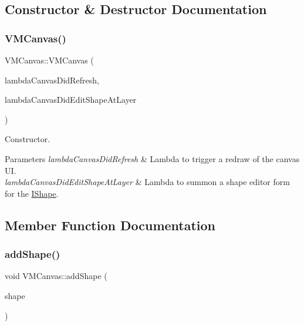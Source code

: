 \subsection{Constructor \& Destructor Documentation}
\mbox{\label{class_v_m_canvas_a82b848f9bd6e7fac849fdf1096bfb682}} 
\subsubsection{\texorpdfstring{VMCanvas()}{VMCanvas()}}
{\footnotesize\ttfamily V\+M\+Canvas\+::\+V\+M\+Canvas (\begin{DoxyParamCaption}\item[{std\+::function$<$ void(void)$>$}]{lambda\+Canvas\+Did\+Refresh,  }\item[{std\+::function$<$ void(\mbox{\hyperlink{class_i_shape}{I\+Shape}} $\ast$)$>$}]{lambda\+Canvas\+Did\+Edit\+Shape\+At\+Layer }\end{DoxyParamCaption})}



Constructor. 


\begin{DoxyParams}{Parameters}
{\em lambda\+Canvas\+Did\+Refresh} & Lambda to trigger a redraw of the canvas UI. \\
\hline
{\em lambda\+Canvas\+Did\+Edit\+Shape\+At\+Layer} & Lambda to summon a shape editor form for the \mbox{\hyperlink{class_i_shape}{I\+Shape}}. \\
\hline
\end{DoxyParams}


\subsection{Member Function Documentation}
\mbox{\label{class_v_m_canvas_a1dafa7eb89dc594c677a4570475c9d39}} 
\subsubsection{\texorpdfstring{addShape()}{addShape()}}
{\footnotesize\ttfamily void V\+M\+Canvas\+::add\+Shape (\begin{DoxyParamCaption}\item[{\mbox{\hyperlink{class_i_shape}{I\+Shape}} $\ast$}]{shape }\end{DoxyParamCaption})}



